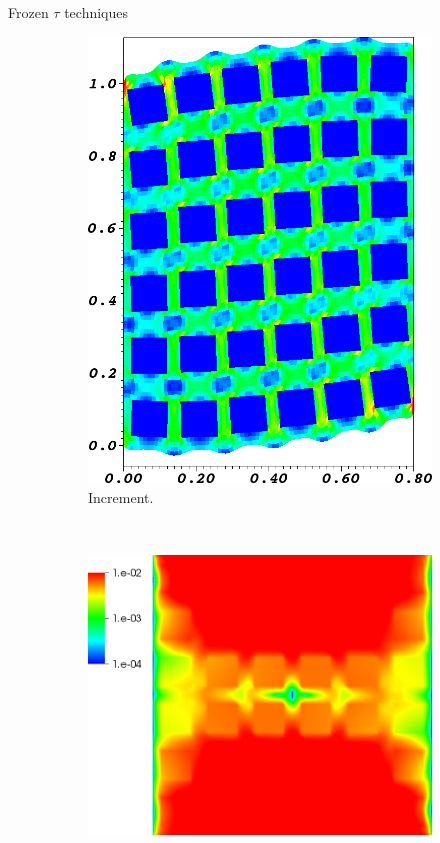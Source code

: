 \documentclass[final,t]{beamer}
\begin{document}
\begin{frame}{}
\begin{columns}
\begin{column}{0.31\textwidth}
\begin{block}{Frozen $\tau$ techniques}
\begin{figure}
\begin{subfigure}[b]{0.18\textwidth}
            \includegraphics[width=\textwidth]{figures/MG/ElasticityCompressShearTrim}
            \caption{\scriptsize Increment.}\label{fig:elast-increment}
          \end{subfigure} ~
          \begin{subfigure}[b]{0.28\textwidth}
            \includegraphics[width=\textwidth]{figures/MG/ElasticityCompressErrorNoTauTrim}

\end{subfigure}
\end{figure}
\end{block}
\end{column}
\end{columns}
\end{frame}
\end{document}
